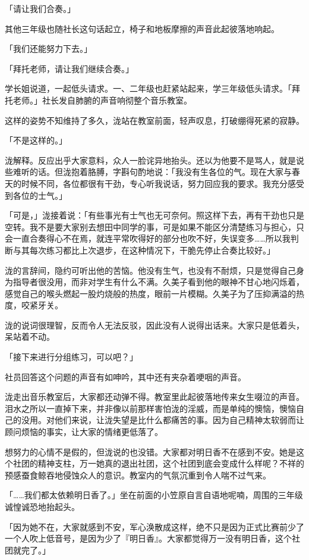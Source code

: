 \documentclass[UTF8]{ctexart}
\begin{document}
    「请让我们合奏。」 

    其他三年级也随社长这句话起立，椅子和地板摩擦的声音此起彼落地响起。 

    「我们还能努力下去。」 

    「拜托老师，请让我们继续合奏。」 

    学长姐说道，一起低头请求。一、二年级也赶紧站起来，学三年级低头请求。「拜托老师。」社长发自肺腑的声音响彻整个音乐教室。 

    这样的姿势不知维持了多久，泷站在教室前面，轻声叹息，打破绷得死紧的寂静。 

    「不是这样的。」 

    泷解释。反应出乎大家意料，众人一脸诧异地抬头。还以为他要不是骂人，就是说些难听的话。但泷抱着胳膊，字斟句酌地说：「我没有生各位的气。现在大家与春天的时候不同，各位都很有干劲，专心听我说话，努力回应我的要求。我充分感受到各位的士气。」 

    「可是，」泷接着说：「有些事光有士气也无可奈何。照这样下去，再有干劲也只是空转。我不是要大家别去想田中同学的事，可是如果不能区分清楚练习与担心，只会一直合奏得心不在焉，就连平常吹得好的部分也吹不好，失误变多……所以我判断与其每次练习都比上次退步，在这种情况下，干脆先停止合奏比较好。」 

    泷的言辞间，隐约可听出他的苦恼。他没有生气，也没有不耐烦，只是觉得自己身为指导者很没用，而非对学生有什么不满。久美子看到他的眼神不甘心地闪烁着，感觉自己的喉头燃起一股灼烧般的热度，眼前一片模糊。久美子为了压抑满溢的热度，咬紧牙关。 

    泷的说词很理智，反而令人无法反驳，因此没有人说得出话来。大家只是低着头，呆站着不动。 

    「接下来进行分组练习，可以吧？」 

    社员回答这个问题的声音有如呻吟，其中还有夹杂着哽咽的声音。 

    泷走出音乐教室后，大家都还动弹不得。教室里此起彼落地传来女生啜泣的声音。泪水之所以一直掉下来，并非像以前那样害怕泷的淫威，而是单纯的懊恼，懊恼自己的没用。对他们来说，让泷失望是比什么都痛苦的事。因为自己精神太软弱而让顾问烦恼的事实，让大家的情绪更低落了。 

    想努力的心情不是假的，但泷说的也没错。大家都对明日香不在感到不安。她是这个社团的精神支柱，万一她真的退出社团，这个社团到底会变成什么样呢？不祥的预感蚕食鲸吞地侵蚀众人的意识。教室内的气氛沉重到令人喘不过气来。 

    「……我们都太依赖明日香了。」坐在前面的小笠原自言自语地呢喃，周围的三年级诚惶诚恐地抬起头。 

    「因为她不在，大家就感到不安，军心涣散成这样，绝不只是因为正式比赛前少了一个人吹上低音号，是因为少了『明日香』。大家都觉得万一没有明日香，这个社团就完了。」 
\end{document}
